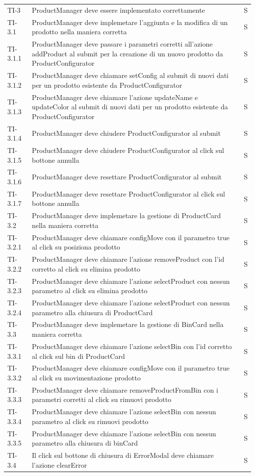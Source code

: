 \begin{xltabular}{0.9\textwidth}{X | p{0.6\textwidth}  | p{0.1\textwidth}}
    TI-3 & ProductManager deve essere implementato correttamente & S\\
    TI-3.1 & ProductManager deve implemetare l'aggiunta e la modifica di un prodotto nella maniera corretta & S\\
    TI-3.1.1 & ProductManager deve passare i parametri corretti all'azione addProduct al submit per la creazione di un nuovo prodotto da ProductConfigurator & S\\
    TI-3.1.2 & ProductManager deve chiamare setConfig al submit di nuovi dati per un prodotto esistente da ProductConfigurator & S\\
    TI-3.1.3 & ProductManager deve chiamare l'azione updateName e updateColor al submit di nuovi dati per un prodotto esistente da ProductConfigurator & S\\
    TI-3.1.4 & ProductManager deve chiudere ProductConfigurator al submit & S\\
    TI-3.1.5 & ProductManager deve chiudere ProductConfigurator al click sul bottone annulla & S\\
    TI-3.1.6 & ProductManager deve resettare ProductConfigurator al submit & S\\
    TI-3.1.7 & ProductManager deve resettare ProductConfigurator al click sul bottone annulla & S\\
    TI-3.2 & ProductManager deve implemetare la gestione di ProductCard nella maniera corretta & S\\
    TI-3.2.1 & ProductManager deve chiamare configMove con il parametro true al click su posiziona prodotto & S\\
    TI-3.2.2 & ProductManager deve chiamare l'azione removeProduct con l'id corretto al click su elimina prodotto & S\\
    TI-3.2.3 & ProductManager deve chiamare l'azione selectProduct con nessun parametro al click su elimina prodotto & S\\
    TI-3.2.4 & ProductManager deve chiamare l'azione selectProduct con nessun parametro alla chiusura di ProductCard & S\\
    TI-3.3 & ProductManager deve implemetare la gestione di BinCard nella maniera corretta & S\\
    TI-3.3.1 & ProductManager deve chiamare l'azione selectBin con l'id corretto al click sul bin di ProductCard & S\\
    TI-3.3.2 & ProductManager deve chiamare configMove con il parametro true al click su movimentazione prodotto & S\\
    TI-3.3.3 & ProductManager deve chiamare removeProductFromBin con i parametri corretti al click su rimuovi prodotto & S\\
    TI-3.3.4 & ProductManager deve chiamare l'azione selectBin con nessun parametro al click su rimuovi prodotto & S\\
    TI-3.3.5 & ProductManager deve chiamare l'azione selectBin con nessun parametro alla chiusura di binCard & S\\
    TI-3.4 & Il click sul bottone di chiusura di ErrorModal deve chiamare l'azione clearError & S\\


\end{xltabular}

